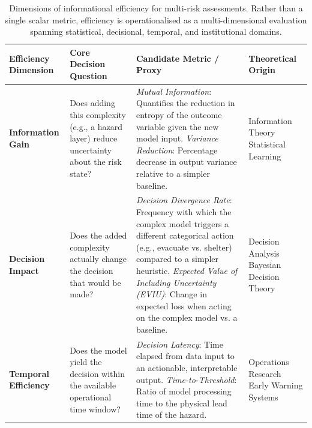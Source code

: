 \usepackage{booktabs} %
\usepackage{tabularx} %

\begin{table}[htbp]
\centering
\caption{Dimensions of informational efficiency for multi-risk assessments. Rather than a single scalar metric, efficiency is operationalised as a multi-dimensional evaluation spanning statistical, decisional, temporal, and institutional domains.}
\label{tab:efficiency_metrics}
\begin{tabularx}{\textwidth}{@{} l l X l @{}}
\toprule
\textbf{Efficiency Dimension} & \textbf{Core Decision Question} & \textbf{Candidate Metric / Proxy} & \textbf{Theoretical Origin} \\
\midrule

\textbf{Information Gain} & Does adding this complexity (e.g., a hazard layer) reduce uncertainty about the risk state? & 
\textit{Mutual Information}: Quantifies the reduction in entropy of the outcome variable given the new model input. \newline
\textit{Variance Reduction}: Percentage decrease in output variance relative to a simpler baseline. & 
Information Theory \newline \newline Statistical Learning \\

\midrule

\textbf{Decision Impact} & Does the added complexity actually change the decision that would be made? & 
\textit{Decision Divergence Rate}: Frequency with which the complex model triggers a different categorical action (e.g., evacuate vs. shelter) compared to a simpler heuristic. \newline
\textit{Expected Value of Including Uncertainty (EVIU)}: Change in expected loss when acting on the complex model vs. a baseline. & 
Decision Analysis \newline \newline Bayesian Decision Theory \\

\midrule

\textbf{Temporal Efficiency} & Does the model yield the decision within the available operational time window? & 
\textit{Decision Latency}: Time elapsed from data input to an actionable, interpretable output. \newline
\textit{Time-to-Threshold}: Ratio of model processing time to the physical lead time of the hazard. & 
Operations Research \newline \newline Early Warning Systems \\


\end{tabularx}
\end{table}
